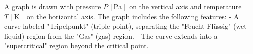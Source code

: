 A graph is drawn with pressure \( P \, [\text{Pa}] \) on the vertical axis and temperature \( T \, [\text{K}] \) on the horizontal axis. The graph includes the following features:  
- A curve labeled "Tripelpunkt" (triple point), separating the "Feucht-Flüssig" (wet-liquid) region from the "Gas" (gas) region.  
- The curve extends into a "supercritical" region beyond the critical point.